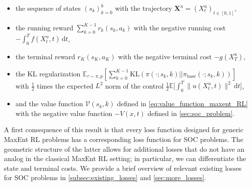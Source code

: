 \documentclass[]{fairmeta}
\begin{document}
\begin{proposition}
\begin{itemize}
    \item the sequence of states $(s_k)_{k=0}^{k}$ with the trajectory $\bm{X}^u = (X^u_t)_{t \in [0,1]}$,
    \item the running reward $\sum_{k=0}^{K-1} r_k(s_k,a_k)$ with the negative running cost $- \int_0^T f(X^u_t,t) \, \mathrm{d}t$, 
    \item the terminal reward $r_K(s_K,a_K)$ with the negative terminal cost $- 
    g(X^u_T)$, 
    \item the KL regularization $\mathbb{E}_{\tau \sim \pi,p}[\sum_{k=0}^{K-1} \mathrm{KL}(\pi(\cdot;s_k,k)||\pi_{\mathrm{base}}(\cdot;s_k,k))]$ with $\frac{1}{2}$ times the expected $L^2$ norm of the control $\frac{1}{2} \mathbb{E} \big[ \int_0^T 
   \|u(X^u_t,t)\|^2 \, \mathrm{d}t \big]$,
   \item and the value function $\mathcal{V}(s_k,k)$ defined in \eqref{eq:value_function_maxent_RL} with the negative value function $-V(x,t)$ defined in \autoref{sec:soc_problem}. 
   \end{itemize}
\end{proposition}

A first consequence of this result is that every loss function designed for generic MaxEnt RL problems has a corresponding loss function for SOC
problems. The geometric structure of the latter allows for additional losses that do not have an analog in the classical MaxEnt RL setting; in particular, we can differentiate the state and terminal costs. We provide a brief overview of relevant existing losses for SOC
problems in \autoref{subsec:existing_losses} and \autoref{sec:more_losses}. %

\end{document}
